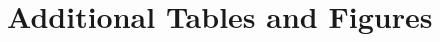 \section{Additional Tables and Figures}
\label{app:tables_and_figures}

\begingroup
\centering
{}
\label{tab:notation}
\footnotesize
